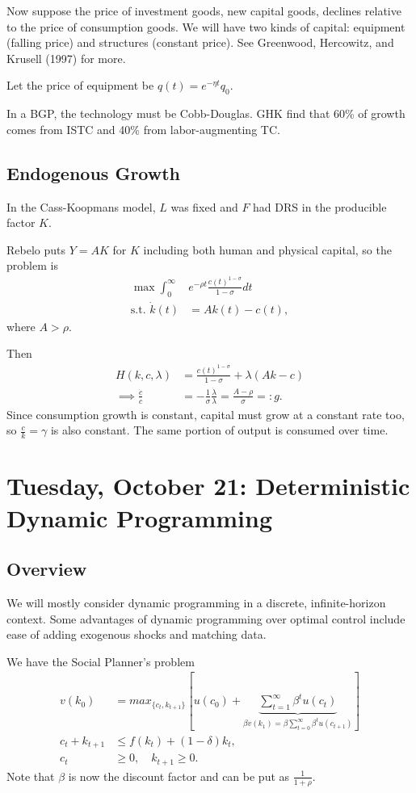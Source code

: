 \documentclass{tufte-handout}
\theoremstyle{definition}
\begin{document}
Now suppose the price of investment goods, new capital goods, declines relative to the price of consumption goods. We will have two kinds of capital: equipment (falling price) and structures (constant price). See Greenwood, Hercowitz, and Krusell (1997) for more.

Let the price of equipment be $q(t) = e^{-\eta t}q_0$.

In a BGP, the technology must be Cobb-Douglas. GHK find that 60\% of growth comes from ISTC and 40\% from labor-augmenting TC.

\subsection{Endogenous Growth}

In the Cass-Koopmans model, $L$ was fixed and $F$ had DRS in the producible factor $K$. 

Rebelo puts $Y = AK$ for $K$ including both human and physical capital, so the problem is
\begin{align*}
	\max \int_{0}^{\infty} & e^{-\rho t} \frac{c(t)^{1-\sigma}}{1-\sigma}dt \\
	\text{s.t. } \dot{k}(t) &= Ak(t) - c(t)
,\end{align*} where $A > \rho$.

Then
\begin{align*}
	H(k,c,\lambda) &= \frac{c(t)^{1-\sigma}}{1-\sigma} + \lambda \left( Ak - c \right) \\
	\implies \frac{\dot{c}}{c} &= -\frac{1}{\sigma} \frac{\dot{\lambda}}{\lambda} = \frac{A-\rho}{\sigma} =: g
.\end{align*}
Since consumption growth is constant, capital must grow at a constant rate too, so $\frac{c}{k} = \gamma$ is also constant. The same portion of output is consumed over time.

\section{Tuesday, October 21: Deterministic Dynamic Programming}
\subsection{Overview}
We will mostly consider dynamic programming in a discrete, infinite-horizon context. Some advantages of dynamic programming over optimal control include ease of adding exogenous shocks and matching data.

We have the Social Planner's problem
\begin{align*}
	v(k_0) &= max_{\{c_t, k_{t+1}\}} \left[ u(c_0) + \underbrace{\sum\limits_{t=1}^{\infty} \beta^{t}u(c_t)}_{\beta v(k_1) = \beta \sum\limits_{t=0}^{\infty} \beta^{t}u(c_{t+1})} \right] \\
	c_t + k_{t+1} &\le f(k_t) + (1-\delta)k_t, \\
	c_t &\ge 0, \quad k_{t+1} \ge 0
.\end{align*}
Note that $\beta$ is now the discount factor and can be put as $\frac{1}{1+\rho}$. 
\end{document}
